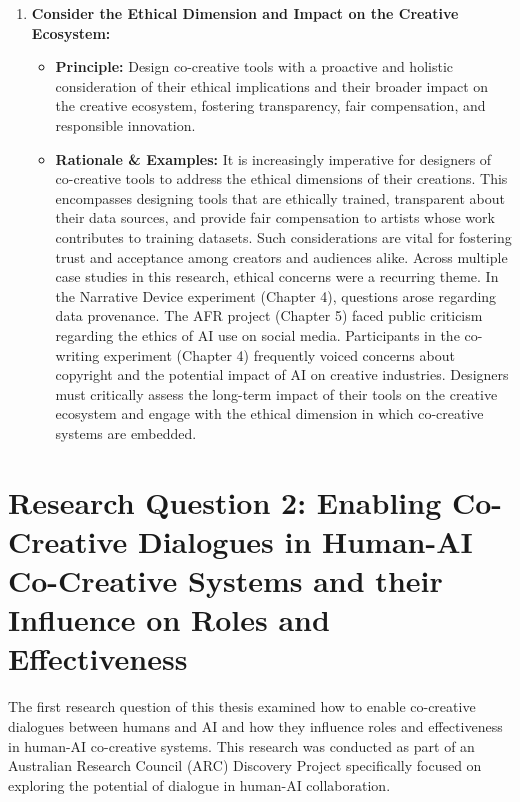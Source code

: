 \begin{enumerate}[label=\arabic*., wide, labelindent=0pt]
\item \textbf{Consider the Ethical Dimension and Impact on the Creative Ecosystem:}
    \begin{itemize}[label=\textbullet, leftmargin=*]
        \item \textbf{Principle:} Design co-creative tools with a proactive and holistic consideration of their ethical implications and their broader impact on the creative ecosystem, fostering transparency, fair compensation, and responsible innovation.
        \item \textbf{Rationale \& Examples:} It is increasingly imperative for designers of co-creative tools to address the ethical dimensions of their creations. This encompasses designing tools that are ethically trained, transparent about their data sources, and provide fair compensation to artists whose work contributes to training datasets. Such considerations are vital for fostering trust and acceptance among creators and audiences alike. Across multiple case studies in this research, ethical concerns were a recurring theme. In the Narrative Device experiment (Chapter 4), questions arose regarding data provenance. The AFR project (Chapter 5) faced public criticism regarding the ethics of AI use on social media. Participants in the co-writing experiment (Chapter 4) frequently voiced concerns about copyright and the potential impact of AI on creative industries. Designers must critically assess the long-term impact of their tools on the creative ecosystem and engage with the ethical dimension in which co-creative systems are embedded.
    \end{itemize}

\end{enumerate}

\section{Research Question 2: Enabling Co-Creative Dialogues in Human-AI Co-Creative Systems and their Influence on Roles and Effectiveness}

The first research question of this thesis examined how to enable co-creative dialogues between humans and AI and how they influence roles and effectiveness in human-AI co-creative systems. This research was conducted as part of an Australian Research Council (ARC) Discovery Project specifically focused on exploring the potential of dialogue in human-AI collaboration.

